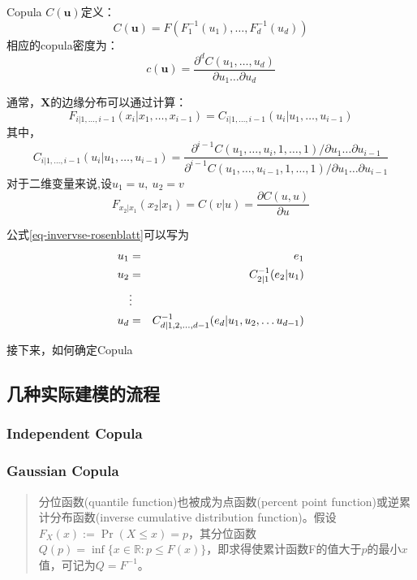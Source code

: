 Copula $C(\mathbf{u})$定义：
\begin{equation}
    \label{eq-cf}
    C(\mathbf{u}) = F(F_1^{-1}(u_1),\dots,F_d^{-1}(u_d))
\end{equation}
相应的copula密度为：
\begin{equation}
    \label{eq-cfd}
    c(\mathbf{u}) = \dfrac{\partial^d C(u_1,\dots,u_d)}{\partial u_1\dots\partial u_d}
\end{equation}

通常，$\mathbf{X}$的边缘分布可以通过计算：
\begin{equation}
    \label{eq-margin}
    F_{i|1,\dots,i-1}(x_i|x_1,\dots,x_{i-1}) = C_{i|1,\dots,i-1}(u_i|u_1,\dots,u_{i-1})
\end{equation}
其中，
\begin{equation}
    \label{eq-margin2}
    C_{i|1,\dots,i-1}(u_i|u_1,\dots,u_{i-1}) = \dfrac{\partial^{i-1}C(u_1,\dots,u_i,1,\dots,1)/\partial u_1\dots\partial u_{i-1}}{\partial^{i-1}C(u_1,\dots,u_{i-1},1,\dots,1)/\partial u_1\dots\partial u_{i-1}} 
\end{equation}
对于二维变量来说,设$u_1 = u,\ u_2 = v$
\begin{equation}
    \label{eq-bivariate}
    F_{x_2|x_1}(x_2|x_1) = C(v|u) = \dfrac{\partial C(u,u)}{\partial u}
\end{equation}

公式\ref{eq-invervse-rosenblatt}可以写为
\begin{eqnarray}
    \label{eq-inverse-transform-using-copula}
    u_1 &=& e_1 \notag \\
    u_2 &=& C_{2|1}^{-1}(e_2|u_1) \notag\\
    &\vdots& \\
    u_d &=& C_{d|1,2,\dots,d-1}^{-1}(e_d|u_1,u_2,\dots u_{d-1}) \notag
\end{eqnarray}

接下来，如何确定Copula


\subsection{几种实际建模的流程}

\subsubsection{Independent Copula}
\subsubsection{Gaussian Copula}
\begin{quotation}
    分位函数(quantile function)也被成为点函数(percent point function)或逆累计分布函数(inverse cumulative distribution function)。假设$F_X(x) := \Pr (X \leq x) = p$，其分位函数$Q(p) = \inf\{x \in \mathbb{R} : p \leq F(x)\}$，即求得使累计函数F的值大于$p$的最小$x$值，可记为$Q = F^{-1}$。
\end{quotation}


